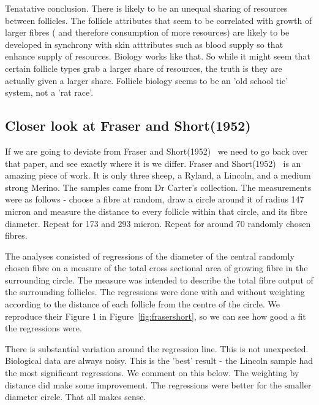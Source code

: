 \documentclass[titlepage]{article}  %
\begin{document}
Tenatative conclusion. There is  likely to be an unequal sharing of resources between follicles. The follicle attributes that seem to be correlated with growth of larger fibres ( and therefore consumption of more resources) are likely to be developed in synchrony with skin atttributes such as blood supply so that enhance supply of resources. Biology works like that. So while it might seem that certain follicle types grab a larger share of resources, the truth is they are actually given a larger share. Follicle biology seems to be an 'old school tie' system, not a 'rat race'. 

\subsection{Closer look at Fraser and Short(1952)~\cite{fras:52}}
If we are going to deviate from Fraser and Short(1952)~\cite{fras:52} we need to go back over that paper, and see exactly where it is we differ. Fraser and Short(1952)~\cite{fras:52} is an amazing piece of work. It is only three sheep, a Ryland, a Lincoln, and a medium strong Merino. The samples came from Dr Carter's collection. The measurements were as follows - choose a fibre at random, draw a circle around it of radius 147 micron and measure the distance to every follicle within that circle, and its fibre diameter. Repeat for 173 and 293 micron. Repeat for around 70 randomly chosen fibres.

The analyses consisted of regressions of the diameter of the central randomly chosen fibre on a measure of the total cross sectional area of growing fibre in the surrounding circle. The measure was intended to describe the total fibre output of the surrounding follicles.  The regressions were done with and without weighting according to the distance of each follicle from the centre of the circle. We reproduce their Figure 1  in Figure~\ref{fig:frasershort}, so we can see how good a fit the regressions were.

There is substantial variation around the regression line. This is not unexpected. Biological data are always noisy. This is the 'best' result - the Lincoln sample had the most significant regressions. We comment on this below. The weighting by distance did make some improvement.  The regressions were better for the smaller diameter circle. That all makes sense.
\end{document}
